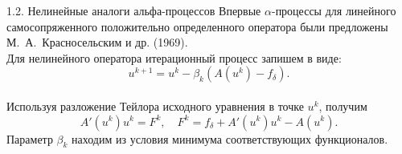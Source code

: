 \documentclass[10pt,pdf, mathserif, hyperref={unicode}]{beamer}
\begin{document}
\begin{frame}{1.2. Нелинейные аналоги альфа-процессов}
	Впервые $\alpha$-процессы для линейного  самосопряженного положительно определенного оператора  были предложены М.~А.~Красносельским и др. (1969). \\
	Для нелинейного оператора итерационный процесс запишем в виде:
	$$u^{k+1}=u^k-\beta_k(A(u^k)-f_{\delta}).$$ \\
	Используя разложение Тейлора исходного уравнения в точке $u^k$, получим
	$$A'(u^k)u^k=F^k, \quad F^k=f_\delta+A'(u^k)u^k-A(u^k).$$ Параметр $\beta_k$ находим из условия минимума соответствующих функционалов.
	\let\thefootnote\relax\let\thefootnote\relax{}
\end{frame}
\end{document}
